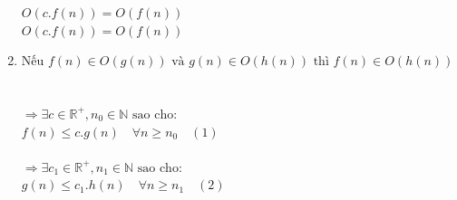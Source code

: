 \documentclass[12pt, letterpaper]{article}
\begin{document}
\begin{enumerate}[label=\bfseries\large\alph*.]
     $O(c.f(n)) = O(f(n))$\\
     $O(c.f(n)) = O(f(n))$

    \item $\text{Nếu } f(n) \in O(g(n)) \text{ và } g(n) \in O(h(n)) \text{ thì } f(n) \in O(h(n))$ \\ \\
     \\
    $\Rightarrow \exists c \in \mathbb{R^+}, n_0 \in \mathbb{N} \text{ sao cho:}$ \\
    $f(n) \leq c.g(n) \quad \forall n \geq n_0 \quad (1)$ \\

     \\
    $\Rightarrow \exists c_1 \in \mathbb{R^+}, n_1 \in \mathbb{N} \text{ sao cho:}$ \\
    $g(n) \leq c_1.h(n) \quad \forall n \geq n_1 \quad (2)$ \\


\end{enumerate}
\end{document}
